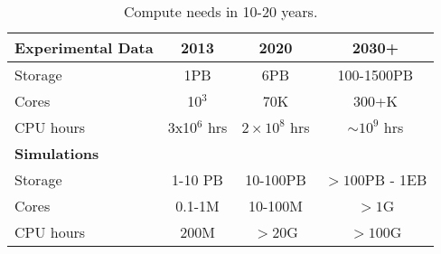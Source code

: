 \begin{center}
\begin{table}
\begin{tabular}{|l|c|c|c|} 
 \hline 
{\bf Experimental Data} & 2013 & 2020 & 2030+ \\
\hline
Storage & 1PB & 6PB & 100-1500PB \\
Cores & 10$^3$ & 70K & 300+K \\
CPU hours & 3x10$^6$ hrs & $2\times 10^8$ hrs & $\sim 10^9$ hrs \\
{\bf Simulations} &&& \\
Storage & 1-10 PB & 10-100PB & $> 100$PB - 1EB\\
Cores & 0.1-1M & 10-100M &$> 1$G\\
CPU hours & 200M & $>$20G & $> 100$G
\label{tab:CompNeeds}
\end{tabular}
\caption{Compute needs in 10-20 years.}
\end{table}
\end{center}




%
